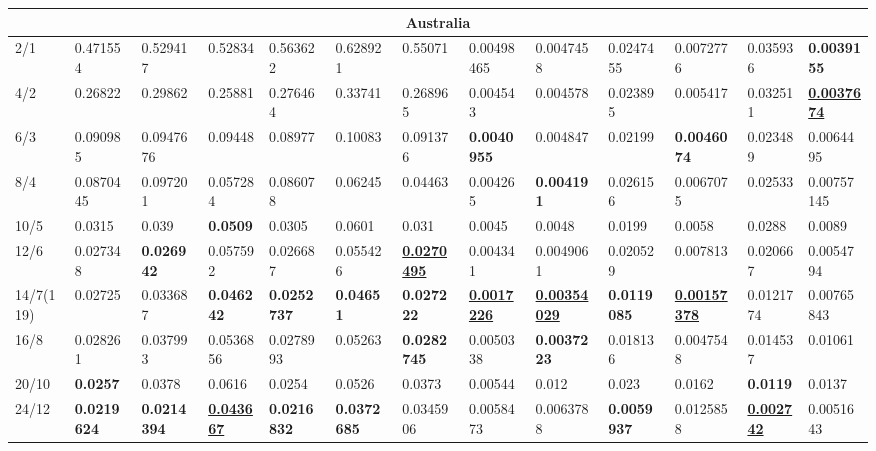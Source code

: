 \begin{landscape}
\begin{table}[]
{\begin{tabular}{@{}lllllllllllll@{}}
\multicolumn{13}{c}{Australia} \\ \midrule
2/1 & 0.471554 & 0.529417 & 0.52834 & 0.563622 & 0.628921 & 0.55071 & 0.00498465 & 0.0047458 & 0.0247455 & 0.0072776 & 0.035936 & {\color[HTML]{34FF34} \textbf{0.0039155}} \\
4/2 & 0.26822 & 0.29862 & 0.25881 & 0.276464 & 0.33741 & 0.268965 & 0.004543 & 0.004578 & 0.023895 & 0.005417 & 0.032511 & {\color[HTML]{009901} {\ul\textbf{0.0037674}}} \\
6/3 & 0.090985 & 0.0947676 & 0.09448 & 0.08977 & 0.10083 & 0.091376 & {\color[HTML]{32CB00} \textbf{0.0040955}} & 0.004847 & 0.02199 & {\color[HTML]{34FF34} \textbf{0.0046074}} & 0.023489 & 0.0064495 \\
8/4 & 0.0870445 & 0.097201 & 0.057284 & 0.086078 & 0.06245 & 0.04463 & 0.004265 & {\color[HTML]{34FF34} \textbf{0.004191}} & 0.026156 & 0.0067075 & 0.02533 & 0.00757145 \\
10/5 & 0.0315 & 0.039 & {\color[HTML]{34FF34} \textbf{0.0509}} & 0.0305 & 0.0601 & 0.031 & 0.0045 & 0.0048 & 0.0199 & 0.0058 & 0.0288 & 0.0089 \\
12/6 & 0.027348 & {\color[HTML]{34FF34} \textbf{0.026942}} & 0.057592 & 0.026687 & 0.055426 & {\color[HTML]{009901} {\ul\textbf{0.0270495}}} & 0.004341 & 0.0049061 & 0.020529 & 0.007813 & 0.020667 & 0.0054794 \\
14/7(119\textendash0) & 0.02725 & 0.033687 & {\color[HTML]{32CB00} \textbf{0.046242}} & {\color[HTML]{34FF34} \textbf{0.0252737}} & {\color[HTML]{34FF34} \textbf{0.04651}} & {\color[HTML]{32CB00} \textbf{0.027222}} & {\color[HTML]{009901} {\ul\textbf{0.0017226}}} & {\color[HTML]{009901} {\ul\textbf{0.00354029}}} & {\color[HTML]{34FF34} \textbf{0.0119085}} & {\color[HTML]{009901} {\ul\textbf{0.00157378}}} & 0.0121774 & 0.00765843 \\
16/8 & 0.028261 & 0.037993 & 0.0536856 & 0.0278993 & 0.05263 & {\color[HTML]{34FF34} \textbf{0.0282745}} & 0.0050338 & {\color[HTML]{32CB00} \textbf{0.0037223}} & 0.018136 & 0.0047548 & 0.014537 & 0.01061 \\
20/10 & {\color[HTML]{34FF34} \textbf{0.0257}} & 0.0378 & 0.0616 & 0.0254 & 0.0526 & 0.0373 & 0.00544 & 0.012 & 0.023 & 0.0162 & {\color[HTML]{34FF34} \textbf{0.0119}} & 0.0137 \\
24/12 & {\color[HTML]{32CB00} \textbf{0.0219624}} & {\color[HTML]{32CB00} \textbf{0.0214394}} & {\color[HTML]{009901} {\ul\textbf{0.043667}}} & {\color[HTML]{32CB00} \textbf{0.0216832}} & {\color[HTML]{32CB00} \textbf{0.0372685}} & 0.0345906 & 0.0058473 & 0.0063788 & {\color[HTML]{32CB00} \textbf{0.0059937}} & 0.0125858 & {\color[HTML]{009901} {\ul\textbf{0.002742}}} & 0.0051643 \\

\end{tabular}}
\end{table}
\end{landscape}
